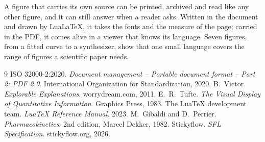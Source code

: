 \documentclass[10pt,twocolumn]{article}
\begin{document}
A figure that carries its own source can be printed, archived and read like any other figure, and it can still answer when a reader
asks. Written in the document and drawn by LuaLaTeX, it takes the fonts and the measure of the page; carried in the PDF, it comes alive
in a viewer that knows its language. Seven figures, from a fitted curve to a synthesizer, show that one small language covers the
range of figures a scientific paper needs.

\begin{thebibliography}{9}
\small
\setlength{\itemsep}{1pt}
 ISO 32000-2:2020. \emph{Document management -- Portable document format -- Part 2: PDF 2.0}. International Organization
for Standardization, 2020.
 B.~Victor. \emph{Explorable Explanations}. worrydream.com, 2011.
 E.~R.~Tufte. \emph{The Visual Display of Quantitative Information}. Graphics Press, 1983.
 The LuaTeX development team. \emph{LuaTeX Reference Manual}. 2023.
 M.~Gibaldi and D.~Perrier. \emph{Pharmacokinetics}. 2nd edition, Marcel Dekker, 1982.
 Stickyflow. \emph{SFL Specification}. stickyflow.org, 2026.
\end{thebibliography}
\end{document}
